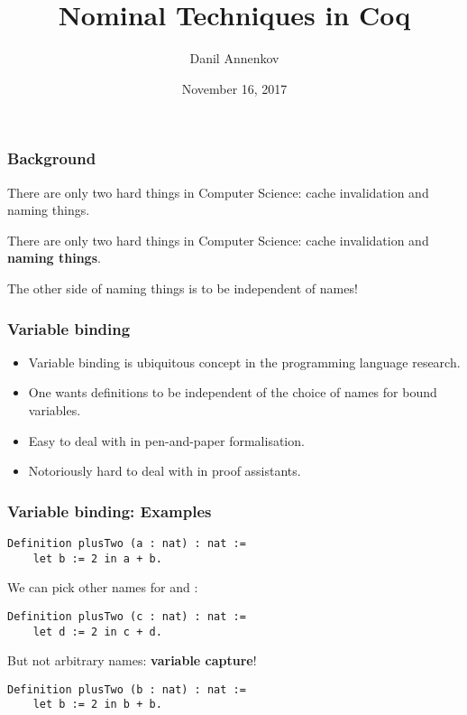 \documentclass[10pt]{beamer}
\title{Nominal Techniques in Coq}
\author{Danil Annenkov}
\institute{University of Copenhagen}
\date{November 16, 2017}
\begin{document}
\maketitle


\begin{frame}
  \frametitle{Background}

   {\begin{exampleblock}{}
    \large{There are only two hard things in Computer Science: cache
    invalidation and naming things.}

    \vskip5mm
  \hspace*{}
  \end{exampleblock}}

   {\begin{exampleblock}{}
    \large{There are only two hard things in Computer Science: cache
      invalidation and \textbf{naming things}.}

    \vskip5mm
    \hspace*{}
  \end{exampleblock}

  The other side of naming things is to be independent of names!}

\end{frame}

\begin{frame}
  \frametitle{Variable binding}
  \begin{itemize}
  \item Variable binding is ubiquitous concept in the programming language research.
  \item One wants definitions to be independent of the choice of names
    for bound variables.
  \item Easy to deal with in pen-and-paper formalisation.
  \item Notoriously hard to deal with in proof assistants.
  \end{itemize}
\end{frame}

\begin{frame}[fragile]
  \frametitle{Variable binding: Examples}
  \begin{lstlisting}
Definition plusTwo (a : nat) : nat :=
    let b := 2 in a + b.
  \end{lstlisting}
  \pause
  We can pick other names for  and :
  \begin{lstlisting}
Definition plusTwo (c : nat) : nat :=
    let d := 2 in c + d.
  \end{lstlisting}
  \pause
  But not arbitrary names: \textbf{variable capture}!
  \begin{lstlisting}
Definition plusTwo (b : nat) : nat :=
    let b := 2 in b + b.
  \end{lstlisting}
\end{frame}
\end{document}
